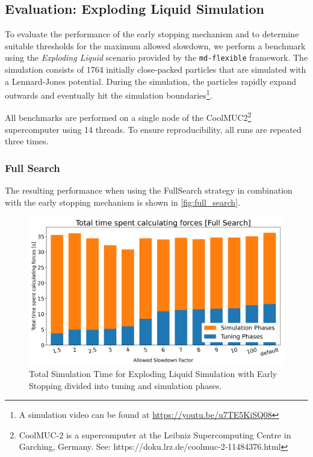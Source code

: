 \documentclass[conference]{IEEEtran}
\begin{document}
\subsection{Evaluation: Exploding Liquid Simulation}
\label{sec:evaluation}

To evaluate the performance of the early stopping mechanism and to determine suitable thresholds for the maximum allowed slowdown, we perform a benchmark using the \textit{Exploding Liquid} scenario provided by the \texttt{md-flexible} framework. The simulation consists of 1764 initially close-packed particles that are simulated with a Lennard-Jones potential. During the simulation, the particles rapidly expand outwards and eventually hit the simulation boundaries\footnote{A simulation video can be found at \url{https://youtu.be/u7TE5KiSQ08}}.

All benchmarks are performed on a single node of the CoolMUC2\footnote{CoolMUC-2 is a supercomputer at the Leibniz Supercomputing Centre in Garching, Germany. See: https://doku.lrz.de/coolmuc-2-11484376.html} supercomputer using 14 threads. To ensure reproducibility, all runs are repeated three times.

\subsubsection{Full Search}

The resulting performance when using the FullSearch strategy in combination with the early stopping mechanism is shown in \autoref{fig:full_search}.

\begin{figure}[H]
    \centering

    \includegraphics[width=\columnwidth]{../data/explodingLiquid/cluster/fullSearch/analytics/total_time_average.png}

    \caption{Total Simulation Time for Exploding Liquid Simulation with Early Stopping divided into tuning and simulation phases.}
    \label{fig:full_search}
\end{figure}
\end{document}
